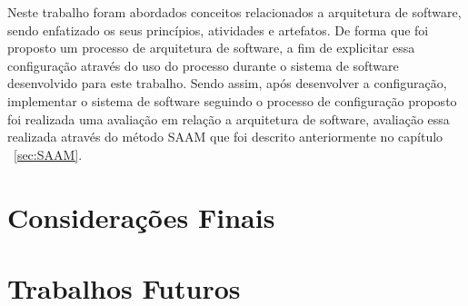 Neste trabalho foram abordados conceitos relacionados a arquitetura de software, sendo enfatizado os seus princípios, atividades e artefatos. De forma que foi proposto um processo de arquitetura de software, a fim de explicitar essa configuração através do uso do processo durante o sistema de software desenvolvido para este trabalho. Sendo assim, após desenvolver a configuração, implementar o sistema de software seguindo o processo de configuração proposto foi realizada uma avaliação em relação a arquitetura de software, avaliação essa realizada através do método \acrfull{SAAM} que foi descrito anteriormente no capítulo ~\ref{sec:SAAM}. 

\section{Considerações Finais}

\section{Trabalhos Futuros}